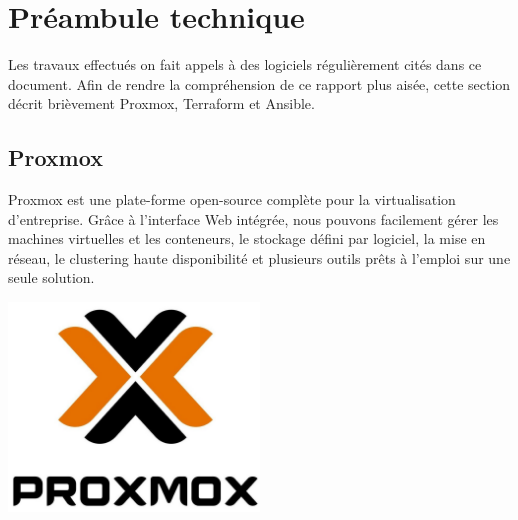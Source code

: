 \documentclass[12pt]{article}
\begin{document}
\newpage
\section{Préambule technique}
Les travaux effectués on fait appels à des logiciels régulièrement cités dans ce document. 
Afin de rendre la compréhension de ce rapport plus aisée, cette section décrit brièvement Proxmox, Terraform et Ansible.

\subsection{Proxmox}
\noindent%
\begin{minipage}{.7\textwidth}%
Proxmox est une plate-forme open-source complète pour la virtualisation d'entreprise. 
Grâce à l'interface Web intégrée, nous pouvons facilement gérer les machines virtuelles et les conteneurs, le stockage défini par logiciel, la mise en réseau, le clustering haute disponibilité et plusieurs outils prêts à l'emploi sur une seule solution. \\

\end{minipage}%
\hfill
\begin{minipage}{.3\textwidth}%
\begin{center}
\includegraphics[width=0.5\textwidth]{src/proxmox.JPG}
\end{center}
\end{minipage}%
\end{document}
